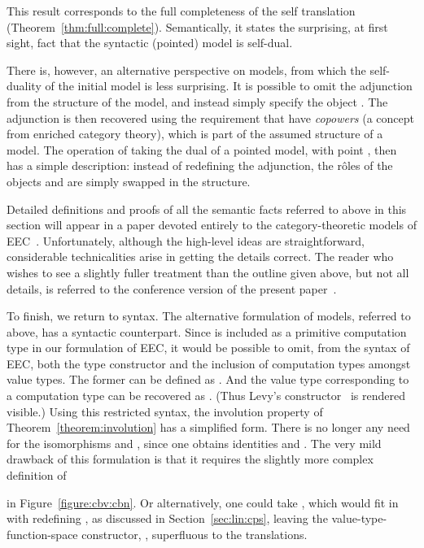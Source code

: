 \documentclass{LMCS}
\begin{document}
\noindent 
This result corresponds to the full completeness of the self translation
(Theorem~\ref{thm:full:complete}). Semantically, it states the
surprising, at first sight, fact that the syntactic (pointed) model is self-dual.

There is, however,  an alternative perspective on models, from which the
self-duality of the initial model is less surprising. It is possible to omit
the adjunction  from the structure of the model, and instead
simply specify the object . The adjunction is then recovered using
the requirement that  have \emph{copowers}
(a concept from  enriched category theory), which is part of the
assumed structure of a model. The operation of taking the dual of a pointed
model, with point , then has a simple description: instead of redefining the
adjunction, the r\^{o}les of the objects  and  are simply swapped in the structure.

Detailed definitions and proofs of 
all the semantic facts referred to above in this section will appear in
a paper devoted entirely to the category-theoretic models of EEC~\cite{EMSc}.
Unfortunately, although  the high-level ideas are straightforward, 
considerable technicalities arise in getting the details correct. 
The reader who wishes to see a slightly fuller treatment
than the outline given above, but not all details, is referred to the conference
version of the present paper~\cite{EMS:fossacs}.

To finish, we return to syntax. The alternative formulation of models, referred to
above, has a syntactic counterpart. Since  is included as a primitive
computation type in our formulation of EEC, it would be possible
to omit, from the syntax of EEC, 
both the  type constructor  and the inclusion
of computation types amongst value types. The former can
be defined as . And the  value type corresponding to
a computation type  can be recovered as  . (Thus Levy's
 constructor~\cite{Levy:book} is rendered visible.) Using this 
restricted syntax, the involution property of Theorem~\ref{theorem:involution}
has a simplified form. There is no longer any need for the isomorphisms
 and , since one obtains identities
 and . 
The very mild drawback of this formulation is that it 
requires the slightly more complex definition of

in Figure~\ref{figure:cbv:cbn}. Or alternatively, one could take
,
which would fit in with redefining
, as
discussed in Section~\ref{sec:lin:cps},
leaving the 
value-type-function-space constructor, , superfluous to the translations.
\end{document}
